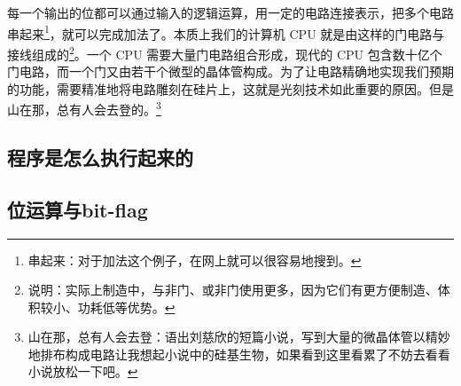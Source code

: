 每一个输出的位都可以通过输入的逻辑运算，用一定的电路连接表示，把多个电路串起来\footnote{串起来：对于加法这个例子，在网上就可以很容易地搜到。}，就可以完成加法了。本质上我们的计算机 CPU 就是由这样的门电路与接线组成的\footnote{说明：实际上制造中，与非门、或非门使用更多，因为它们有更方便制造、体积较小、功耗低等优势。}。一个 CPU 需要大量门电路组合形成，现代的 CPU 包含数十亿个门电路，而一个门又由若干个微型的晶体管构成。为了让电路精确地实现我们预期的功能，需要精准地将电路雕刻在硅片上，这就是光刻技术如此重要的原因。但是山在那，总有人会去登的。\footnote{山在那，总有人会去登：语出刘慈欣的短篇小说，写到大量的微晶体管以精妙地排布构成电路让我想起小说中的硅基生物，如果看到这里看累了不妨去看看小说放松一下吧。}

\subsection{程序是怎么执行起来的}
\subsection{位运算与bit-flag}